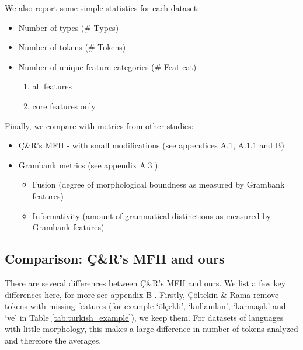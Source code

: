 \documentclass[USenglish]{article}
\begin{document}
\noindent We also report some simple statistics for each dataset: %

\begin{itemize}
  \setcounter{enumi}{9}  %
  \item Number of types (\# Types)
  \item Number of tokens (\# Tokens)
  \item Number of unique feature categories (\# Feat cat)%
      \begin{enumerate}
    \renewcommand{\labelenumi}{\alph{enumi})}
 \item  all features
  \item core features only
 \end{enumerate}
 \end{itemize}

Finally, we compare with metrics from other studies: 

\begin{itemize}
    \item Ç\&R's MFH - with small modifications (see appendices A.1, A.1.1 
    and B)
\item Grambank metrics (see appendix A.3
):   \begin{itemize}
    \item Fusion (degree of morphological boundness as measured by Grambank features)
    \item Informativity (amount of grammatical distinctions as measured by Grambank features)
    \end{itemize}
\end{itemize}


\subsection{Comparison: Ç\&R's MFH and ours}
\label{sec:CR_comparison}

There are several differences between Ç\&R's MFH and ours. We list a few key differences here, for more see appendix B
.
Firstly, Çöltekin \& Rama remove tokens with missing features (for example `ölçekli', `kullanılan', `karmaşık' and `ve' in Table \ref{tab:turkish_example}), we keep them. 
For datasets of languages with little morphology, this makes a large difference in number of tokens analyzed and therefore the averages.
\end{document}
